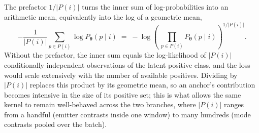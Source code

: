 The prefactor $1/\lvert P(i)\rvert$ turns the inner sum of log-probabilities into an arithmetic mean, equivalently into the log of a geometric mean,
\begin{equation}\label{eq:method:supcon_geomean}
  -\frac{1}{\lvert P(i)\rvert} \sum_{p \in P(i)} \log P_{\bm{\theta}}(p \mid i)
  \;=\;
  -\log\!\left(\,\prod_{p \in P(i)} P_{\bm{\theta}}(p \mid i)\right)^{\!1/\lvert P(i)\rvert}.
\end{equation}
Without the prefactor, the inner sum equals the log-likelihood of $\lvert P(i)\rvert$ conditionally independent observations of the latent positive class, and the loss would scale extensively with the number of available positives.
Dividing by $\lvert P(i)\rvert$ replaces this product by its geometric mean, so an anchor's contribution becomes intensive in the size of its positive set; this is what allows the same kernel to remain well-behaved across the two branches, where $\lvert P(i)\rvert$ ranges from a handful (emitter contrasts inside one window) to many hundreds (mode contrasts pooled over the batch).
